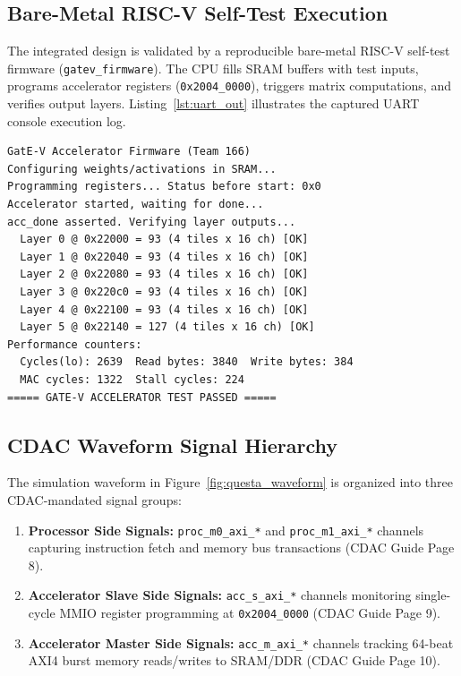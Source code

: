 \documentclass[10pt,journal,compsoc,twocolumn]{IEEEtran}
\begin{document}
\subsection{Bare-Metal RISC-V Self-Test Execution}
The integrated design is validated by a reproducible bare-metal RISC-V self-test firmware (\texttt{gatev\_firmware}). The CPU fills SRAM buffers with test inputs, programs accelerator registers (\texttt{0x2004\_0000}), triggers matrix computations, and verifies output layers. Listing~\ref{lst:uart_out} illustrates the captured UART console execution log.

\begin{minipage}{0.94\linewidth}
\begin{lstlisting}[caption={UART Console Output from VEGA AS1061 RISC-V Core Executing GatE-V Accelerator Self-Test}, label={lst:uart_out}]
GatE-V Accelerator Firmware (Team 166)
Configuring weights/activations in SRAM...
Programming registers... Status before start: 0x0
Accelerator started, waiting for done...
acc_done asserted. Verifying layer outputs...
  Layer 0 @ 0x22000 = 93 (4 tiles x 16 ch) [OK]
  Layer 1 @ 0x22040 = 93 (4 tiles x 16 ch) [OK]
  Layer 2 @ 0x22080 = 93 (4 tiles x 16 ch) [OK]
  Layer 3 @ 0x220c0 = 93 (4 tiles x 16 ch) [OK]
  Layer 4 @ 0x22100 = 93 (4 tiles x 16 ch) [OK]
  Layer 5 @ 0x22140 = 127 (4 tiles x 16 ch) [OK]
Performance counters:
  Cycles(lo): 2639  Read bytes: 3840  Write bytes: 384
  MAC cycles: 1322  Stall cycles: 224
===== GATE-V ACCELERATOR TEST PASSED =====
\end{lstlisting}
\end{minipage}

\subsection{CDAC Waveform Signal Hierarchy}
The simulation waveform in Figure~\ref{fig:questa_waveform} is organized into three CDAC-mandated signal groups:
\begin{enumerate}
    \item \textbf{Processor Side Signals:} \texttt{proc\_m0\_axi\_*} and \texttt{proc\_m1\_axi\_*} channels capturing instruction fetch and memory bus transactions (CDAC Guide Page 8).
    \item \textbf{Accelerator Slave Side Signals:} \texttt{acc\_s\_axi\_*} channels monitoring single-cycle MMIO register programming at \texttt{0x2004\_0000} (CDAC Guide Page 9).
    \item \textbf{Accelerator Master Side Signals:} \texttt{acc\_m\_axi\_*} channels tracking 64-beat AXI4 burst memory reads/writes to SRAM/DDR (CDAC Guide Page 10).
\end{enumerate}
\end{document}
